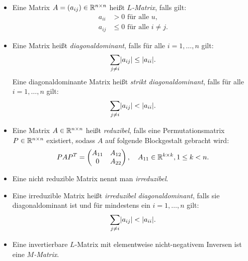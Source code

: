 \documentclass{exercise}
\begin{document}
    \begin{problem}
        \begin{itemize}
            \item Eine Matrix \(A = \parentheses*{a_{ij}} \in \R^{n \times n}\) heißt \emph{\(L\)-Matrix}, falls gilt:
            \begin{align*}
                a_{ii} &> 0\text{ für alle }u,\\
                a_{ij} &\le 0\text{ für alle }i \ne j.
            \end{align*}
            \item Eine Matrix heißt \emph{diagonaldominant}, falls für alle \(i = 1, \ldots, n\) gilt:
            \[
                \sum_{j \ne i}\absolute*{a_{ij}} \le \absolute*{a_{ii}}.
            \]
            Eine diagonaldominante Matrix heißt \emph{strikt diagonaldominant}, falls für alle \(i = 1, \ldots, n\) gilt:
            \[
                \sum_{j \ne i}\absolute*{a_{ij}} < \absolute*{a_{ii}}.
            \]
            \item Eine Matrix \(A \in \R^{n \times n}\) heißt \emph{reduzibel}, falls eine Permutationsmatrix \(P \in \R^{n \times n}\) existiert, sodass \(A\) auf folgende Blockgestalt gebracht wird:
            \[
                PAP^T = \begin{pmatrix}
                    A_{11} & A_{12}\\
                    0 & A_{22}
                \end{pmatrix}, \quad A_{11} \in \R^{k \times k}, 1 \le k < n.
            \]
            \item Eine nicht reduzible Matrix nennt man \emph{irreduzibel}.
            \item Eine irreduzible Matrix heißt \emph{irreduzibel diagonaldominant}, falls sie diagonaldominant ist und für mindestens ein \(i = 1, \ldots, n\) gilt:
            \[
                \sum_{j \ne i}\absolute*{a_{ij}} < \absolute*{a_{ii}}.
            \]
            \item Eine invertierbare \(L\)-Matrix mit elementweise nicht-negativem Inversen ist eine \emph{\(M\)-Matrix}.


\end{itemize}
\end{problem}
\end{document}
